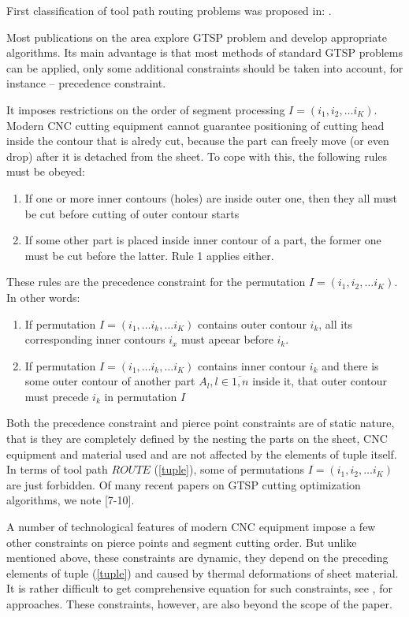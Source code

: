 \documentclass{ifacconf}
\begin{document}
First classification of tool path routing problems
was proposed in:
\cite{Hoeft1997Sep}.

Most publications on the area explore GTSP problem
and develop appropriate algorithms.
Its main advantage is that most methods
of standard GTSP problems can be applied,
only some additional constraints should be
taken into account,
for instance -- precedence constraint.

It imposes restrictions on the order of
segment processing
$I = (i_1, i_2, \dots i_K)$.
Modern CNC cutting equipment cannot guarantee
positioning of cutting head inside the contour
that is alredy cut,
because the part can freely move
(or even drop)
after it is detached from the sheet.
To cope with this,
the following rules must be obeyed:

\begin{enumerate}
    \item{If one or more inner contours (holes) are inside outer one,
    then they all must be cut before cutting of outer contour starts
    }
    \item{If some other part is placed inside
    inner contour of a part,
    the former one must be cut before the latter.
    Rule 1 applies either.}
\end{enumerate}
These rules are the precedence constraint
for the permutation
$I = (i_1, i_2, \dots i_K)$.
In other words:
\begin{enumerate}
    \item{If permutation
    $I = (i_1, \dots i_k, \dots i_K)$
    contains outer contour $i_k$,
    all its corresponding inner contours $i_x$
    must apeear before $i_k$.
    }
    \item{If permutation
    $I = (i_1, \dots i_k, \dots i_K)$
    contains inner contour $i_k$
    and there is some outer contour
    of another part $A_l, l \in \overline{1,n}$
    inside it,
    that outer contour must precede $i_k$
    in permutation $I$}
\end{enumerate}

Both the precedence constraint
and pierce point constraints
are of static nature,
that is they are completely defined by
the nesting the parts on the sheet,
CNC equipment and material used
and are not affected by the elements
of tuple itself.
In terms of tool path $ROUTE$
(\ref{tuple}),
some of permutations
$I = (i_1, i_2, \dots i_K)$
are just forbidden.
Of many recent papers
on GTSP cutting optimization algorithms,
we note [7-10].

A number of technological features of modern CNC equipment
impose a few other constraints on
pierce points and segment cutting order.
But unlike mentioned above,
these constraints are dynamic,
they depend on the preceding elements
of tuple (\ref{tuple})
and caused by
thermal deformations of sheet material.
It is rather difficult to get comprehensive
equation for such constraints,
see \cite{chentsov2013dynamic}, \cite{chentsov2015model} for approaches.
These constraints, however,
are also beyond the scope of the paper.
\end{document}
